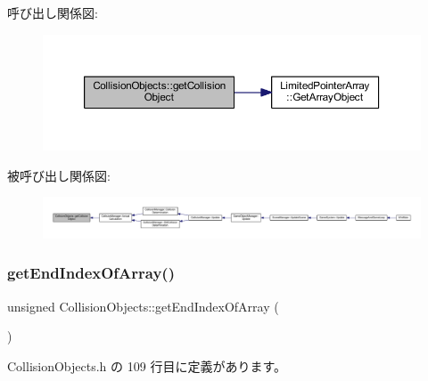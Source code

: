 呼び出し関係図\+:\nopagebreak
\begin{figure}[H]
\begin{center}
\leavevmode
\includegraphics[width=350pt]{class_collision_objects_a4f5c029b20a7ed4c7fdee815f73d20be_cgraph}
\end{center}
\end{figure}
被呼び出し関係図\+:
\nopagebreak
\begin{figure}[H]
\begin{center}
\leavevmode
\includegraphics[width=350pt]{class_collision_objects_a4f5c029b20a7ed4c7fdee815f73d20be_icgraph}
\end{center}
\end{figure}
\mbox{\label{class_collision_objects_a309eef4695b4a19f389eaf5d0753c256}} 
\subsubsection{\texorpdfstring{get\+End\+Index\+Of\+Array()}{getEndIndexOfArray()}}
{\footnotesize\ttfamily unsigned Collision\+Objects\+::get\+End\+Index\+Of\+Array (\begin{DoxyParamCaption}{ }\end{DoxyParamCaption})\hspace{0.3cm}{\ttfamily [inline]}}



 Collision\+Objects.\+h の 109 行目に定義があります。

